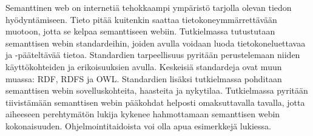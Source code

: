 \documentclass[finnish, 12pt, a4paper, elec, utf8, pdfa, online]{aaltothesis}
\date{24.4.2018}
\begin{document}
\makecoverpage

\makecopyrightpage

\begin{abstractpage}[finnish]
Semanttinen web on internetiä tehokkaampi ympäristö tarjolla olevan tiedon hyödyntämiseen. Tieto pitää kuitenkin saattaa tietokoneymmärrettävään muotoon, jotta se kelpaa semanttiseen webiin. Tutkielmassa tutustutaan semanttisen webin standardeihin, joiden avulla voidaan luoda tietokoneluettavaa ja -pääteltävää tietoa. Standardien tarpeellisuus pyritään perustelemaan niiden käyttökohteiden ja erikoisuuksien avulla. Keskeisiä standardeja ovat muun muassa: RDF, RDFS ja OWL. Standardien lisäksi tutkielmassa pohditaan semanttisen webin sovelluskohteita, haasteita ja nykytilaa. Tutkielmassa pyritään tiivistämään semanttisen webin pääkohdat helposti omaksuttavalla tavalla, jotta aiheeseen perehtymätön lukija kykenee hahmottamaan semanttisen webin kokonaisuuden. Ohjelmointitaidoista voi olla apua esimerkkejä lukiessa.
\end{abstractpage}


\newpage







\end{document}
